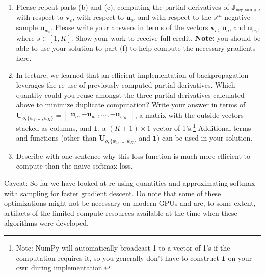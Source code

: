 \documentclass{article}
\begin{document}
\begin{enumerate}[label=(\alph*)]
\begin{enumerate}[label=(\roman*)]
\item Please repeat parts (b) and (c), computing the partial derivatives of $\bm J_{\text{neg-sample}}$ with respect to $\bm v_c$, with respect to $\bm u_o$, and with respect to the $s^{th}$ negative sample $\bm u_{w_s}$. Please write your answers in terms of the vectors $\bm v_c$, $\bm u_o$, and $\bm u_{w_s}$, where $s \in [1, K]$. Show your work to receive full credit. \textbf{Note:} you should be able to use your solution to part (f) to help compute the necessary gradients here.

\item In lecture, we learned that an efficient implementation of backpropagation leverages the re-use of previously-computed partial derivatives. Which quantity could you reuse amongst the three partial derivatives calculated above to minimize duplicate computation? Write your answer in terms of \\ $\bm{U}_{o, \{w_1, \dots, w_K\}} = \begin{bmatrix} \bm{u}_o, -\bm{u}_{w_1}, \dots, -\bm{u}_{w_K} \end{bmatrix}$, a matrix with the outside vectors stacked as columns, and $\bm{1}$, a $(K + 1) \times 1$ vector of 1's.\footnote{Note: NumPy will automatically broadcast 1 to a vector of 1's if the computation requires it, so you generally don't have to construct $\bm{1}$ on your own during implementation.}
Additional terms and functions (other than $\bm{U}_{o, \{w_1, \dots, w_K\}}$ and $\bm{1}$) can be used in your solution.
\item Describe with one sentence why this loss function is much more efficient to compute than the naive-softmax loss.
\end{enumerate}

Caveat: So far we have looked at re-using quantities and approximating softmax with sampling for faster gradient descent. Do note that some of these optimizations might not be necessary on modern GPUs and are, to some extent, artifacts of the limited compute resources available at the time when these algorithms were developed.


\end{enumerate}
\end{document}
